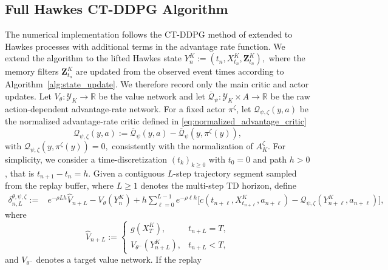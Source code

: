 \documentclass[11pt]{article}
\theoremstyle{remarkitalic}
\theoremstyle{remarkitalic}
\newcommand{\R}{\mathbb R}
\newcommand{\1}{\mathbf 1}
\begin{document}
\subsection{Full Hawkes CT-DDPG Algorithm}
\label{sec:hawkes_ctddpg_training}
 The numerical implementation follows the CT-DDPG method of
\cite{ChengGuoZhang2026} extended to Hawkes processes with additional terms in the advantage rate function. We extend the algorithm to the lifted Hawkes state
$
    Y_n^K
    :=
    \left(
        t_n,X_{t_n}^K,\mathbf Z_{t_n}^K
    \right),
$
where the memory filters $\mathbf Z_{t_n}^K$ are updated from the
observed event times according to
Algorithm~\ref{alg:state_update}. We therefore record only the main
critic and actor updates. Let $V_\theta:
    \mathcal Y_K\longrightarrow\R$
be the value network and let
$\overline {\mathcal Q}_\psi:
    \mathcal Y_K\times A\longrightarrow\R$
be the raw action-dependent advantage-rate network. For a fixed actor
$\pi^\zeta$, let ${\mathcal Q}_{\psi,\zeta}(y,a)$ be the normalized advantage-rate critic defined in \eqref{eq:normalized_advantage_critic}
\begin{equation*}
    {\mathcal Q}_{\psi,\zeta}(y,a)
    :=
    \overline {\mathcal Q}_\psi(y,a)
    -
    \overline {\mathcal Q}_\psi
    \left(
        y,\pi^\zeta(y)
    \right),
\end{equation*}
with ${\mathcal Q}_{\psi,\zeta}
    \left(
        y,\pi^\zeta(y)
    \right)
    =0,$
consistently with the normalization of
$A_K^\zeta$. For simplicity, we consider a time-discretization $(t_k)_{k\geq 0}$ with $t_0=0$ and path $h>0$, that is $t_{n+1}-t_n=h.$
Given a contiguous \(L\)-step trajectory segment sampled from the
replay buffer, where \(L\ge1\) denotes the multi-step TD horizon,
define
\begin{align*}
    \delta_{n,L}^{\theta,\psi,\zeta}
    :={}&
    e^{-\rho Lh}\widehat V_{n+L}
    -
    V_\theta(Y_n^K)+
    h\sum_{\ell=0}^{L-1}
    e^{-\rho\ell h}
    \Big[
        c\left(
            t_{n+\ell},
            X_{t_{n+\ell}}^K,
            a_{n+\ell}
        \right)
        -
        {\mathcal Q}_{\psi,\zeta}
        \left(
            Y_{n+\ell}^K,
            a_{n+\ell}
        \right)
    \Big],
\end{align*}
where
\[
    \widehat V_{n+L}
    :=
    \begin{cases}
        g(X_T^K),
        & t_{n+L}=T,\\
        V_{\theta^-}(Y_{n+L}^K),
        & t_{n+L}<T,
    \end{cases}
\]
and $V_{\theta^-}$ denotes a target value network. If the replay
\end{document}
